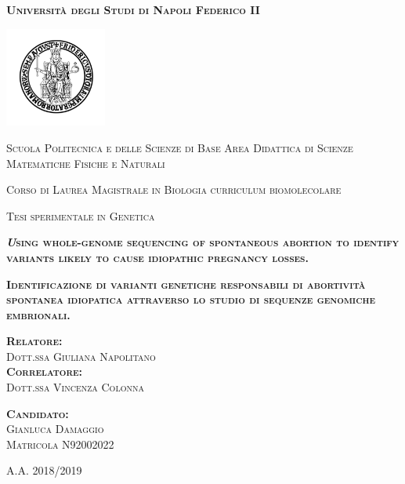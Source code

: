 \documentclass[
11pt, %
oneside, %
english, %
singlespacing, %
headsepline, %
chapterinoneline, %
]{MastersDoctoralThesis} %
\author{Gianluca Damaggio }
\date{24 May 2020}
\begin{document}
\begin{titlepage}
\centering
{\scshape\large\normalfont\bfseries Università degli Studi di Napoli Federico II \par}
 \vspace{0.7cm} 
 \includegraphics[width=0.25\textwidth]{fig/logo.png}
 \par
 \vspace{0.5cm}
\hspace{2cm}
{\scshape\large\normalfont Scuola Politecnica e delle Scienze di Base
\newline
Area Didattica di Scienze Matematiche Fisiche e Naturali
 \par}
 \vspace{0.5cm}
{\scshape\large\normalfont Corso di Laurea Magistrale in Biologia curriculum biomolecolare
 \par}
 \vspace{0.5cm} 
{\scshape\large\normalfont Tesi sperimentale in Genetica
 \par}
  \vspace{0.8cm}
{\scshape\large\normalfont\bfseries\textit Using whole-genome sequencing of spontaneous abortion to identify variants likely to cause idiopathic pregnancy losses.
 \par}
  \vspace{0.8cm}
{\scshape\large\normalfont\bfseries  Identificazione di varianti genetiche responsabili di abortività spontanea idiopatica attraverso lo studio di sequenze genomiche embrionali.
 \par} 
\vspace{2cm} 
\begin{minipage}{0.45\textwidth}
{\scshape\normalfont\large\bfseries Relatore:}\\
{\scshape\normalfont\large Dott.ssa Giuliana Napolitano} \\ 
{\scshape\normalfont\large\bfseries Correlatore:} \\
{\scshape\normalfont\large Dott.ssa Vincenza Colonna}\\
\end{minipage}
\hspace{2.5cm}
\begin{minipage}{0.25\textwidth}
{\scshape\normalfont\large\bfseries Candidato:}\\
 {\scshape\normalfont\large Gianluca Damaggio \\
 Matricola N92002022} 
\end{minipage}

\vfill
\centering
\vspace{0.48cm} 
{\scshape\Large\normalfont A.A. 2018/2019}

\end{titlepage}
\end{document}
